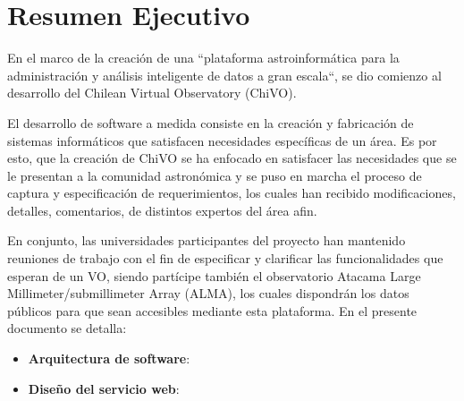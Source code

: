 \section{Resumen Ejecutivo}

En el marco de la creación de una ``plataforma
astroinformática para la administración y análisis inteligente de datos a gran
escala``, se dio comienzo al desarrollo del Chilean Virtual Observatory (ChiVO).

El desarrollo de software a medida consiste en la creación y fabricación de
sistemas informáticos que satisfacen necesidades específicas de un área. Es por
esto, que la creación de ChiVO se ha enfocado en satisfacer las necesidades que
se le presentan a la comunidad astronómica y se puso en marcha el proceso de
captura y especificación de requerimientos, los cuales han recibido
modificaciones, detalles, comentarios, de distintos expertos del área afin.

En conjunto, las universidades participantes del proyecto han mantenido
reuniones de trabajo con el fin de especificar y clarificar las funcionalidades
que esperan de un VO, siendo partícipe también el observatorio Atacama Large
Millimeter/submillimeter Array (ALMA), los cuales dispondrán los datos públicos
para que sean accesibles mediante esta plataforma. En el presente documento se
detalla:
\begin{itemize}
	\item \textbf{Arquitectura de software}: 
	\item \textbf{Diseño del servicio web}:
\end{itemize}

